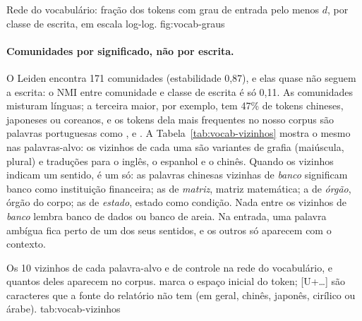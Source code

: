     {Rede do vocabulário: fração dos tokens com grau de entrada pelo menos $d$, por classe de
    escrita, em escala log-log.}
    {fig:vocab-graus}

\paragraph{Comunidades por significado, não por escrita.} O Leiden encontra 171 comunidades
(estabilidade 0,87), e elas quase não seguem a escrita: o NMI entre comunidade e classe de
escrita é só 0,11. As comunidades misturam línguas; a terceira maior, por exemplo, tem 47\% de
tokens chineses, japoneses ou coreanos, e os tokens dela mais frequentes no nosso corpus são
palavras portuguesas como ,  e . A
Tabela~\ref{tab:vocab-vizinhos} mostra o mesmo nas palavras-alvo: os vizinhos de cada uma são
variantes de grafia (maiúscula, plural) e traduções para o inglês, o espanhol e o chinês.
Quando os vizinhos indicam um sentido, é um só: as palavras chinesas vizinhas de \emph{banco}
significam banco como instituição financeira; as de \emph{matriz}, matriz matemática; a de
\emph{órgão}, órgão do corpo; as de \emph{estado}, estado como condição. Nada entre os vizinhos
de \emph{banco} lembra banco de dados ou banco de areia. Na entrada, uma palavra ambígua fica
perto de um dos seus sentidos, e os outros só aparecem com o contexto.

    {Os 10 vizinhos de cada palavra-alvo e de controle na rede do vocabulário, e quantos deles
    aparecem no corpus. \esp{} marca o espaço inicial do token; [U+\ldots] são caracteres que a
    fonte do relatório não tem (em geral, chinês, japonês, cirílico ou árabe).}
    {tab:vocab-vizinhos}

